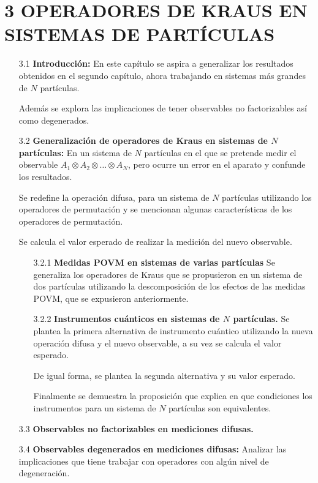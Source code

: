 \documentclass[12pt,oneside]{book}\raggedbottom{} %
\begin{document}
\begin{sloppypar}
{{\section*{3 OPERADORES DE KRAUS EN SISTEMAS DE \texorpdfstring{}{N} PARTÍCULAS}
\begin{itemize}
\item[3.1] \textbf{Introducción:} En este capítulo se aspira a generalizar los resultados obtenidos en el segundo capítulo, ahora trabajando en sistemas más grandes de $N$ partículas.

Además se explora las implicaciones de tener observables no factorizables así como degenerados.
\item[3.2] \textbf{Generalización de operadores de Kraus en sistemas de $N$ partículas:} En un sistema de $N$ partículas en el que se pretende medir el observable $A_1\otimes A_2\otimes \hdots \otimes A_N$, pero ocurre un error en  el aparato y confunde los resultados.

Se redefine la operación difusa, para un sistema de $N$ partículas utilizando los operadores de permutación y se mencionan algunas características de los operadores de permutación. 

Se calcula el valor esperado de realizar la medición del nuevo observable.

\begin{itemize}
  \item[3.2.1] \textbf{Medidas POVM en sistemas de varias partículas}
  Se generaliza los operadores de Kraus que se propusieron en un sistema de dos partículas utilizando la descomposición de los efectos de las medidas POVM, que se expusieron anteriormente.
  \item[3.2.2] \textbf{Instrumentos cuánticos en sistemas de $N$ partículas.} 
  Se plantea la primera alternativa de instrumento cuántico utilizando la nueva operación difusa y el nuevo observable, a su vez se calcula el valor esperado. 
  
  De igual forma, se plantea la segunda alternativa y su valor esperado. 
  
  Finalmente se demuestra la proposición que explica en que condiciones los instrumentos para un sistema de $N$ partículas son equivalentes.

\end{itemize} 


\item[3.3] \textbf{Observables no factorizables en mediciones difusas.}

\item[3.4] \textbf{Observables degenerados en mediciones difusas:}
Analizar las implicaciones que tiene trabajar con operadores con algún nivel de degeneración.


\end{itemize}}}
\end{sloppypar}
\end{document}
